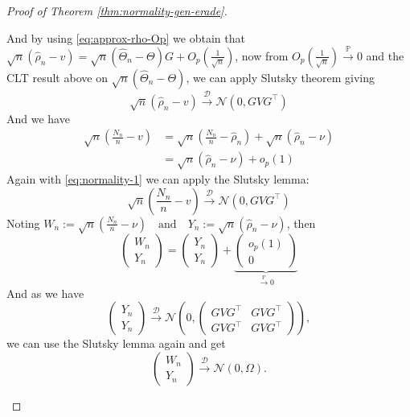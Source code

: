 \documentclass[11pt]{article}
\theoremstyle{plain}
\theoremstyle{definition}
\begin{document}
\begin{appendix}
\begin{proof}[Proof of Theorem \ref{thm:normality-gen-erade}]
\begin{enumerate}[label=(\roman*)]
		And by using \eqref{eq:approx-rho-Op} we obtain that \(\sqrt{n} (\hat{\rho}_n - v) = \sqrt{n} (\hat{\Theta}_n - \Theta) G + O_p\!\left(\frac{1}{\sqrt{n}}\right)\), now from \(O_p\!\left(\frac{1}{\sqrt{n}}\right) \xrightarrow{\mathbb{P}} 0\) and the CLT result above on \(\sqrt n(\hat\Theta_n-\Theta)\), we can apply Slutsky theorem giving
		\begin{equation}\label{eq:normality-1}
			\sqrt{n} (\hat{\rho}_n - v) \xrightarrow{\mathcal{D}} \mathcal{N}(0, GVG^{\top})
		\end{equation}
		And we have
		\begin{align*}
			\sqrt{n} \left( \frac{N_n}{n} - v \right) 
			&= \sqrt{n} \left( \frac{N_n}{n} - \hat{\rho}_n \right)
			+ \sqrt{n} (\hat{\rho}_n - \nu)\\
			&= \sqrt{n} (\hat{\rho}_n - \nu) + o_p(1)
		\end{align*}
		Again with \eqref{eq:normality-1} we can apply the Slutsky lemma:
		\[
		\sqrt{n} \left( \frac{N_n}{n} - v \right) \xrightarrow{\mathcal{D}} \mathcal{N}(0,GVG^{\top})
		\]
		Noting \(W_n := \sqrt{n} \left( \frac{N_n}{n} - \nu \right) 
		\quad \text{and} \quad Y_n := \sqrt{n} (\hat{\rho}_n - \nu)\), then
		\[
		\begin{pmatrix}
			W_n \\
			Y_n
		\end{pmatrix}
		=
		\begin{pmatrix}
			Y_n \\
			Y_n
		\end{pmatrix}
		+
		\underbrace{\begin{pmatrix}
				o_p(1) \\
				0
		\end{pmatrix}}_{\xrightarrow{\mathbb{P}} 0}
		\]
		And as we have
		\[
		\begin{pmatrix}
			Y_n \\
			Y_n
		\end{pmatrix}
		\xrightarrow{\mathcal{D}} 
		\mathcal{N}\left(0,\begin{pmatrix}
			GVG^{\top} & GVG^{\top} \\
			GVG^{\top} & GVG^{\top}
		\end{pmatrix}
		\right),
		\]
		we can use the Slutsky lemma again and get
		\[
		\begin{pmatrix}
			W_n \\
			Y_n
		\end{pmatrix}
		\xrightarrow{\mathcal{D}} \mathcal{N}(0,\Omega).
		\]
	\end{enumerate}	
\end{proof}


\end{appendix}
\end{document}
